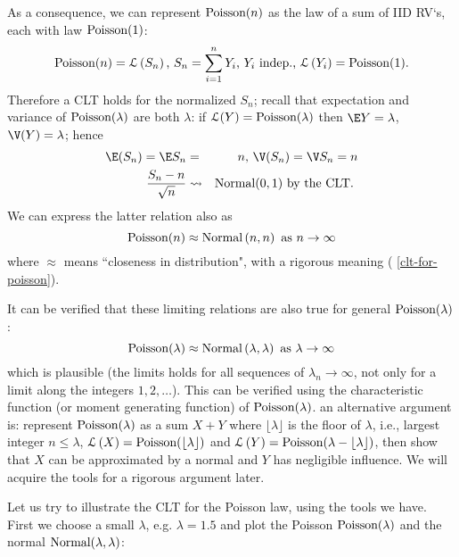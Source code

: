 As a consequence, we can represent $\mbox{{\rm Poisson}}(n)$ as the law of a sum of
IID RV`s, each with law $\mbox{{\rm Poisson}}(1)$:%
\begin{equation*}
\poisson(n)=\mathcal{L}\left( S_{n}\right) \text{, }S_{n}=%
\sum_{i=1}^{n}Y_{i}\text{, }Y_{i}\text{ indep., }\mathcal{L}\left(
Y_{i}\right) =\poisson(1).
\end{equation*}%
Therefore a CLT holds for the normalized $S_{n}$; recall that expectation
and variance of $\mbox{{\rm Poisson}}(\lambda )$ are both $\lambda $: if $\mathcal{L}%
(Y)=\poisson(\lambda )$ then $\E Y=\lambda $, $\V(Y)=\lambda $;
hence 
\begin{eqnarray}
\E (S_n) = \E S_{n} &=&n\text{, }\V(S_{n})= \V S_n = n \\
\frac{S_{n}-n}{\sqrt{n}} &\rightsquigarrow &\normal(0,1)\text{ by the CLT. }
\label{clt-for-poisson}
\end{eqnarray}%
We can express the latter relation also as 
\begin{equation*}
\mbox{{\rm Poisson}}(n)\approx \mbox{{\rm Normal}}\left( n,n\right) \text{ as }n\rightarrow \infty
\end{equation*}%
where $\approx $ means ``closeness in distribution", with a rigorous meaning (%
\ref{clt-for-poisson}). \bigskip \bigskip

\begin{rem}
It can be verified that these limiting relations are also
true for general $\mbox{{\rm Poisson}}(\lambda )$:%
\begin{equation*}
\poisson(\lambda )\approx \normal\left( \lambda ,\lambda \right) \text{ as }%
\lambda \rightarrow \infty
\end{equation*}%
which is plausible (the limits holds for all sequences of $\lambda
_{n}\rightarrow \infty $, not only for a limit along the integers $%
1,2,\ldots $). This can be verified using the characteristic function (or moment generating function) of $%
\poisson(\lambda )$. an alternative argument is: represent $\poisson%
(\lambda )$ as a sum $X+Y$ where $\lfloor \lambda \rfloor$ is the floor of $\lambda$, i.e., largest integer $n\leq
\lambda $, $\mathcal{L}\left( X\right) =\mbox{{\rm Poisson}}(\lfloor \lambda \rfloor)$ and $%
\mathcal{L}\left( Y\right) =\poisson(\lambda - \lfloor \lambda \rfloor)$, then show
that $X$ can be approximated by a normal and $Y$ has negligible influence.
We will acquire the tools for a rigorous argument later.
\end{rem}

Let us try to illustrate the CLT for the Poisson law, using the tools we
have. First we choose a small $\lambda $, e.g. $\lambda =1.5$ and plot the
Poisson $\mbox{{\rm Poisson}}(\lambda )$ and the normal $\mbox{{\rm Normal}}(\lambda ,\lambda )$:


